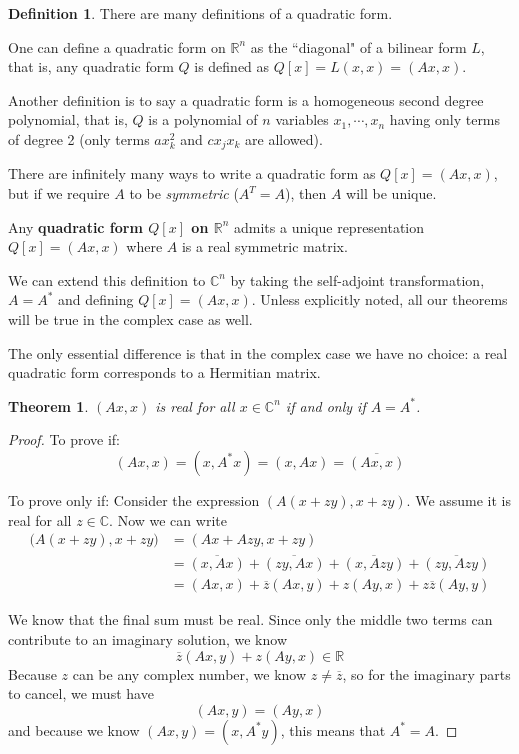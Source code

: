 \documentclass[a4paper,10pt]{book}
\newcommand{\R}{\mathbb{R}}
\newcommand{\C}{\mathbb{C}}
\theoremstyle{plain}
\newtheorem{theorem}{Theorem}[section]
\theoremstyle{plain}
\theoremstyle{remark}
\theoremstyle{definition}
\newtheorem{definition}{Definition}[section]
\begin{document}
\begin{definition}
There are many definitions of a quadratic form. 

One can define a quadratic form on $\R^{n}$ as the ``diagonal" of a bilinear form $L$, that is, any quadratic form $Q$ is defined as $Q[x] = L(x, x) = (Ax, x)$. 

Another definition is to say a quadratic form is a homogeneous second degree polynomial, that is, $Q$ is a polynomial of $n$ variables $x_{1}, \cdots, x_{n}$ having only terms of degree 2 (only terms $ax_{k}^{2}$ and $cx_{j} x_{k}$ are allowed).

There are infinitely many ways to write a quadratic form as $Q[x] = (Ax, x)$, but if we require $A$ to be \textit{symmetric} ($A^{T} = A$), then $A$ will be unique. 

Any \textbf{quadratic form $Q[x]$ on $\R^{n}$} admits a unique representation $Q[x] = (Ax, x)$ where $A$ is a real symmetric matrix. 

We can extend this definition to $\C^{n}$ by taking the self-adjoint transformation, $A = A^{*}$ and defining $Q[x] = (Ax, x)$. Unless explicitly noted, all our theorems will be true in the complex case as well. 

\end{definition}

The only essential difference is that in the complex case we have no choice: a real quadratic form corresponds to a Hermitian matrix. 

\begin{theorem}
$(Ax, x)$ is real for all $x \in \C^{n}$ if and only if $A = A^{*}$.  
\end{theorem}

\begin{proof}
To prove if: 
$$(Ax, x) = (x, A^{*} x) = (x, Ax) = \overline{(Ax, x)}$$

To prove only if: Consider the expression $(A (x + zy), x + zy)$. We assume it is real for all $z \in \C$. Now we can write 
$$
\begin{aligned}
\Big( A (x + zy), x + zy \Big) &= ( Ax + Azy, x + zy) \\
&= \overline{(x, Ax)} + \overline{(zy, Ax)} + \overline{(x, Azy)} + \overline{(zy, Azy)} \\ 
&= (Ax, x) + \overline{z} (Ax, y) + z (Ay, x) + z \overline{z} (Ay, y)
\end{aligned}
$$

We know that the final sum must be real. Since only the middle two terms can contribute to an imaginary solution, we know 
$$\overline{z} (Ax, y) + z (Ay, x) \in \R$$
Because $z$ can be any complex number, we know $z \neq \overline{z}$, so for the imaginary parts to cancel, we must have
$$(Ax, y) = (Ay, x)$$
and because we know $(Ax, y) = (x, A^{*} y)$, this means that $A^{*} = A$. 
\end{proof}
\end{document}
